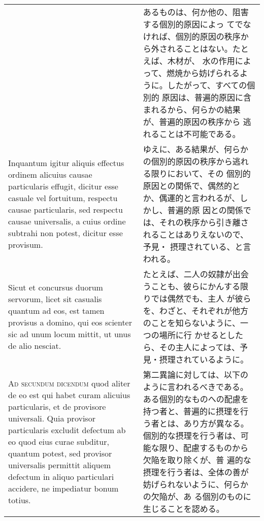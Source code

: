 \documentclass[10pt]{jsarticle} %
\begin{document}
\begin{longtable}{p{21em}p{21em}}
&

あるものは、何か他の、阻害する個別的原因によっ
 てでなければ、個別的原因の秩序から外されることはない。たとえば、木材が、
 水の作用によって、燃焼から妨げられるように。したがって、すべての個別的
 原因は、普遍的原因に含まれるから、何らかの結果が、普遍的原因の秩序から
 逃れることは不可能である。


\\


Inquantum igitur aliquis
effectus ordinem alicuius causae particularis effugit, dicitur esse
casuale vel fortuitum, respectu causae particularis, sed respectu causae
universalis, a cuius ordine subtrahi non potest, dicitur esse
provisum. 


&

ゆえに、ある結果が、何らかの個別的原因の秩序から逃れる限りにおいて、その
 個別的原因との関係で、偶然的とか、偶運的と言われるが、しかし、普遍的原
 因との関係では、それの秩序から引き離されることはありえないので、予見・
 摂理されている、と言われる。


\\


Sicut et concursus duorum servorum, licet sit casualis quantum
ad eos, est tamen provisus a domino, qui eos scienter sic ad unum locum
mittit, ut unus de alio nesciat.



&

たとえば、二人の奴隷が出会うことも、彼らにかんする限りでは偶然でも、主人
 が彼らを、わざと、それぞれが他方のことを知らないように、一つの場所に行
 かせるとしたら、その主人によっては、予見・摂理されているように。


\\




{\scshape Ad secundum dicendum} quod aliter de eo est
qui habet curam alicuius particularis, et de provisore universali. Quia
provisor particularis excludit defectum ab eo quod eius curae subditur,
quantum potest, sed provisor universalis permittit aliquem defectum in
aliquo particulari accidere, ne impediatur bonum totius. 

&

第二異論に対しては、以下のように言われるべきである。
ある個別的なものへの配慮を持つ者と、普遍的に摂理を行う者とは、あり方が異なる。
個別的な摂理を行う者は、可能な限り、配慮するものから欠陥を取り除くが、普
 遍的な摂理を行う者は、全体の善が妨げられないように、何らかの欠陥が、あ
 る個別のものに生じることを認める。




\end{longtable}
\end{document}
